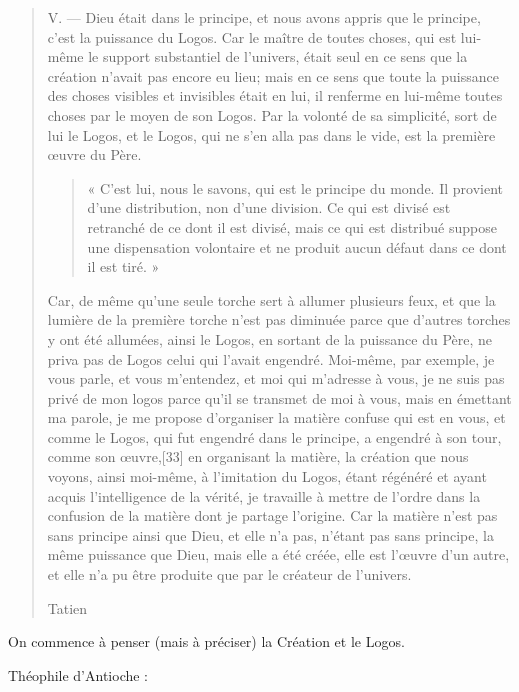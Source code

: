   \begin{quote}
V. — Dieu était dans le principe, et nous avons appris que le principe, c’est la puissance du Logos. Car le maître de toutes choses, qui est lui-même le support substantiel de l’univers, était seul en ce sens que la création n’avait pas encore eu lieu; mais en ce sens que toute la puissance des choses visibles et invisibles était en lui, il renferme en lui-même toutes choses par le moyen de son Logos. Par la volonté de sa simplicité, sort de lui le Logos, et le Logos, qui ne s’en alla pas dans le vide, est la première œuvre du Père. \begin{quote}
    « C’est lui, nous le savons, qui est le principe du monde. Il provient d’une distribution, non d’une division. Ce qui est divisé est retranché de ce dont il est divisé, mais ce qui est distribué suppose une dispensation volontaire et ne produit aucun défaut dans ce dont il est tiré. »
\end{quote} Car, de même qu’une seule torche sert à allumer plusieurs feux, et que la lumière de la première torche n’est pas diminuée parce que d’autres torches y ont été allumées, ainsi le Logos, en sortant de la puissance du Père, ne priva pas de Logos celui qui l’avait engendré. Moi-même, par exemple, je vous parle, et vous m’entendez, et moi qui m’adresse à vous, je ne suis pas privé de mon logos parce qu’il se transmet de moi à vous, mais en émettant ma parole, je me propose d’organiser la matière confuse qui est en vous, et comme le Logos, qui fut engendré dans le principe, a engendré à son tour, comme son œuvre,[33] en organisant la matière, la création que nous voyons, ainsi moi-même, à l’imitation du Logos, étant régénéré et ayant acquis l’intelligence de la vérité, je travaille à mettre de l’ordre dans la confusion de la matière dont je partage l’origine. Car la matière n’est pas sans principe ainsi que Dieu, et elle n’a pas, n’étant pas sans principe, la même puissance que Dieu, mais elle a été créée, elle est l’œuvre d’un autre, et elle n’a pu être produite que par le créateur de l’univers.

      Tatien
  \end{quote}
  
  On commence à penser (mais à préciser) la Création et le Logos.
  
  Théophile d'Antioche  : 

